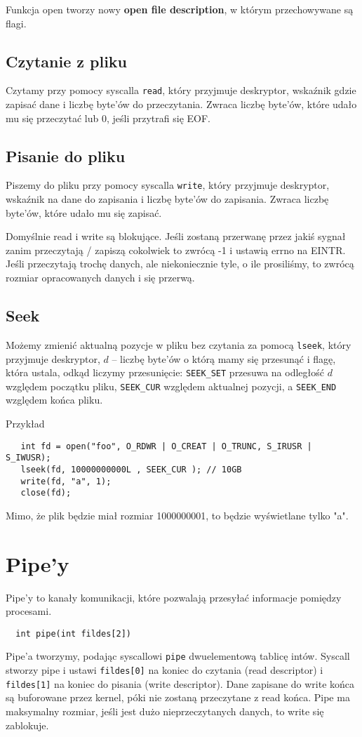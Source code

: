 Funkcja open tworzy nowy \textbf{open file description}, w którym przechowywane są flagi.
\subsection{Czytanie z pliku}
Czytamy przy pomocy syscalla \texttt{read}, który przyjmuje deskryptor, wskaźnik gdzie zapisać dane i liczbę byte'ów do przeczytania. Zwraca liczbę byte'ów, które udało mu się przeczytać lub 0, jeśli przytrafi się EOF.
\subsection{Pisanie do pliku}
Piszemy do pliku przy pomocy syscalla \texttt{write}, który przyjmuje deskryptor, wskaźnik na dane do zapisania i liczbę byte'ów do zapisania. Zwraca liczbę byte'ów, które udało mu się zapisać.

Domyślnie read i write są blokujące. Jeśli zostaną przerwanę przez jakiś sygnał zanim przeczytają / zapiszą cokolwiek to zwrócą -1 i ustawią errno na EINTR. Jeśli przeczytają trochę danych, ale niekoniecznie tyle, o ile prosiliśmy, to zwrócą rozmiar opracowanych danych i się przerwą.
\subsection{Seek}
Możemy zmienić aktualną pozycje w pliku bez czytania za pomocą \texttt{lseek}, który przyjmuje deskryptor, \(d\) -- liczbę byte'ów o którą mamy się przesunąć i flagę, która ustala, odkąd liczymy przesunięcie: \texttt{SEEK\_SET} przesuwa na odległość \(d\) względem początku pliku, \texttt{SEEK\_CUR} względem aktualnej pozycji, a \texttt{SEEK\_END} względem końca pliku.

Przykład
\begin{verbatim}
   int fd = open("foo", O_RDWR | O_CREAT | O_TRUNC, S_IRUSR | S_IWUSR);
   lseek(fd, 10000000000L , SEEK_CUR ); // 10GB
   write(fd, "a", 1);
   close(fd);
\end{verbatim}
Mimo, że plik będzie miał rozmiar 1000000001, to będzie wyświetlane tylko "a".
\section{Pipe'y}
Pipe'y to kanały komunikacji, które pozwalają przesyłać informacje pomiędzy procesami.
\begin{verbatim}
  int pipe(int fildes[2])
\end{verbatim}
Pipe'a tworzymy, podając syscallowi \texttt{pipe} dwuelementową tablicę intów. Syscall stworzy pipe i ustawi \verb|fildes[0]| na koniec do czytania (read descriptor) i \verb|fildes[1]| na koniec do pisania (write descriptor). Dane zapisane do write końca są buforowane przez kernel, póki nie zostaną przeczytane z read końca. Pipe ma maksymalny rozmiar, jeśli jest dużo nieprzeczytanych danych, to write się zablokuje.
